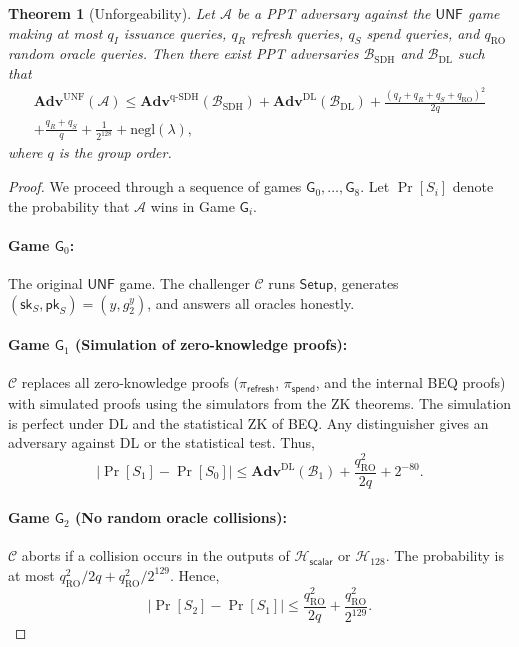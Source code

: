 \documentclass[11pt]{article}
\theoremstyle{definitionstyle}
\newtheorem{theorem}{Theorem}[section]
\theoremstyle{plain}
\newcommand{\advantage}[1]{\mathbf{Adv}^{\mathrm{#1}}}
\newcommand{\negl}{\mathrm{negl}}
\begin{document}
\begin{theorem}[Unforgeability]
Let $\mathcal{A}$ be a PPT adversary against the $\mathsf{UNF}$ game making at most $q_I$ issuance queries, $q_R$ refresh queries, $q_S$ spend queries, and $q_{\text{RO}}$ random oracle queries. Then there exist PPT adversaries $\mathcal{B}_{\text{SDH}}$ and $\mathcal{B}_{\text{DL}}$ such that
\begin{align*}
\advantage{UNF}(\mathcal{A}) \le \advantage{q\text{-}SDH}(\mathcal{B}_{\text{SDH}}) + \advantage{DL}(\mathcal{B}_{\text{DL}}) + \frac{(q_I+q_R+q_S+q_{\text{RO}})^2}{2q} \\
+ \frac{q_R+q_S}{q} + \frac{1}{2^{128}} + \negl(\lambda),
\end{align*}
where $q$ is the group order.
\end{theorem}
\begin{proof}
We proceed through a sequence of games $\mathsf{G}_0,\dots,\mathsf{G}_8$. Let $\Pr[S_i]$ denote the probability that $\mathcal{A}$ wins in Game $\mathsf{G}_i$.

\paragraph{Game $\mathsf{G}_0$:} The original $\mathsf{UNF}$ game. The challenger $\mathcal{C}$ runs $\mathsf{Setup}$, generates $(\mathsf{sk}_S,\mathsf{pk}_S)=(y,g_2^y)$, and answers all oracles honestly.

\paragraph{Game $\mathsf{G}_1$ (Simulation of zero-knowledge proofs):} $\mathcal{C}$ replaces all zero-knowledge proofs ($\pi_{\mathsf{refresh}}$, $\pi_{\mathsf{spend}}$, and the internal BEQ proofs) with simulated proofs using the simulators from the ZK theorems. The simulation is perfect under DL and the statistical ZK of BEQ. Any distinguisher gives an adversary against DL or the statistical test. Thus,
\[
|\Pr[S_1] - \Pr[S_0]| \le \advantage{DL}(\mathcal{B}_1) + \frac{q_{\text{RO}}^2}{2q} + 2^{-80}.
\]

\paragraph{Game $\mathsf{G}_2$ (No random oracle collisions):} $\mathcal{C}$ aborts if a collision occurs in the outputs of $\mathcal{H}_{\mathsf{scalar}}$ or $\mathcal{H}_{128}$. The probability is at most $q_{\text{RO}}^2/2q + q_{\text{RO}}^2/2^{129}$. Hence,
\[
|\Pr[S_2] - \Pr[S_1]| \le \frac{q_{\text{RO}}^2}{2q} + \frac{q_{\text{RO}}^2}{2^{129}}.
\]


\end{proof}
\end{document}
